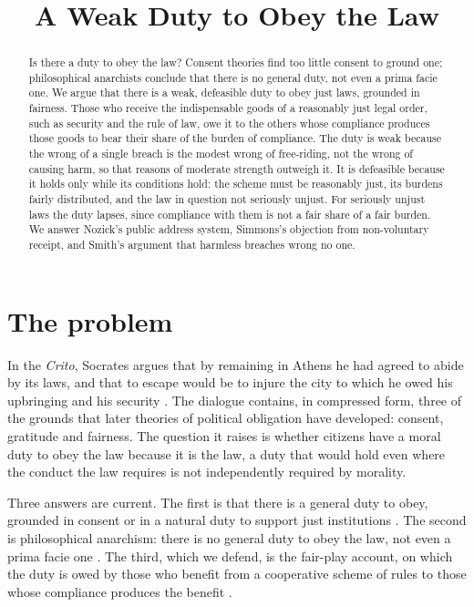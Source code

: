 \documentclass{situationist-preprint}
\title{A Weak Duty to Obey the Law}
\begin{document}
\maketitle

\begin{abstract}
Is there a duty to obey the law? Consent theories find too little consent to ground one; philosophical anarchists conclude that there is no general duty, not even a prima facie one. We argue that there is a weak, defeasible duty to obey just laws, grounded in fairness. Those who receive the indispensable goods of a reasonably just legal order, such as security and the rule of law, owe it to the others whose compliance produces those goods to bear their share of the burden of compliance. The duty is weak because the wrong of a single breach is the modest wrong of free-riding, not the wrong of causing harm, so that reasons of moderate strength outweigh it. It is defeasible because it holds only while its conditions hold: the scheme must be reasonably just, its burdens fairly distributed, and the law in question not seriously unjust. For seriously unjust laws the duty lapses, since compliance with them is not a fair share of a fair burden. We answer Nozick's public address system, Simmons's objection from non-voluntary receipt, and Smith's argument that harmless breaches wrong no one.
\end{abstract}

\section{The problem}

In the \emph{Crito}, Socrates argues that by remaining in Athens he had agreed to abide by its laws, and that to escape would be to injure the city to which he owed his upbringing and his security \citep[50a--54d]{PlatoCrito}. The dialogue contains, in compressed form, three of the grounds that later theories of political obligation have developed: consent, gratitude and fairness. The question it raises is whether citizens have a moral duty to obey the law because it is the law, a duty that would hold even where the conduct the law requires is not independently required by morality.

Three answers are current. The first is that there is a general duty to obey, grounded in consent \citep[\S\S 95--122]{Locke1689} or in a natural duty to support just institutions \citep[\S 19]{Rawls1971}. The second is philosophical anarchism: there is no general duty to obey the law, not even a prima facie one \citep{Smith1973,Simmons1979,Raz1979}. The third, which we defend, is the fair-play account, on which the duty is owed by those who benefit from a cooperative scheme of rules to those whose compliance produces the benefit \citep{Hart1955,Rawls1964,Klosko1992}.
\end{document}
